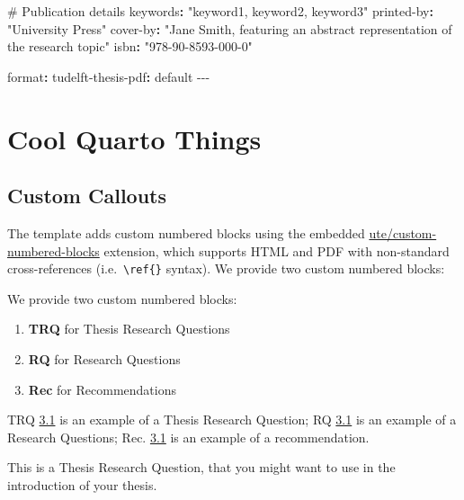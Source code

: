 \documentclass{tudelft}
\newenvironment{Shaded}{\begin{snugshade}}{\end{snugshade}}
\newcommand{\AttributeTok}[1]{\textcolor[rgb]{0.40,0.45,0.13}{#1}}
\newcommand{\CommentTok}[1]{\textcolor[rgb]{0.37,0.37,0.37}{#1}}
\newcommand{\FunctionTok}[1]{\textcolor[rgb]{0.28,0.35,0.67}{#1}}
\newcommand{\KeywordTok}[1]{\textcolor[rgb]{0.00,0.23,0.31}{\textbf{#1}}}
\newcommand{\PreprocessorTok}[1]{\textcolor[rgb]{0.68,0.00,0.00}{#1}}
\newcommand{\StringTok}[1]{\textcolor[rgb]{0.13,0.47,0.30}{#1}}
\providecommand{\tightlist}{%
  \setlength{\itemsep}{0pt}\setlength{\parskip}{0pt}}
\newenvironment{fbx}[3]{\begin{tcolorbox}[enhanced, breakable,%
attach boxed title to top*={xshift=1.4pt},
boxed title style={boxrule=0.0mm, fuzzy shadow={1pt}{-1pt}{0mm}{0.1mm}{gray}, arc=.3em, rounded corners=east, sharp corners=west}, colframe=#1-color2, colbacktitle=#1-color1, colback = white, coltitle=black,  titlerule=0mm, toprule=0pt, bottomrule=.7pt, leftrule=.3em, rightrule=0pt, outer arc=.3em,  arc=0pt,	 sharp corners = east, left=.5em, bottomtitle=1mm, toptitle=1mm,title=\textbf{#2}\hspace{0.5em}{#3}]}
{\end{tcolorbox}}
\begin{document}
\begin{Shaded}
\begin{Highlighting}[]
\CommentTok{\# Publication details}
\FunctionTok{keywords}\KeywordTok{:}\AttributeTok{ }\StringTok{"keyword1, keyword2, keyword3"}
\FunctionTok{printed{-}by}\KeywordTok{:}\AttributeTok{ }\StringTok{"University Press"}
\FunctionTok{cover{-}by}\KeywordTok{:}\AttributeTok{ }\StringTok{"Jane Smith, featuring an abstract representation of the research topic"}
\FunctionTok{isbn}\KeywordTok{:}\AttributeTok{ }\StringTok{"978{-}90{-}8593{-}000{-}0"}

\FunctionTok{format}\KeywordTok{:}
\AttributeTok{  }\FunctionTok{tudelft{-}thesis{-}pdf}\KeywordTok{:}\AttributeTok{ default}
\PreprocessorTok{{-}{-}{-}}
\end{Highlighting}
\end{Shaded}


\chapter{Cool Quarto Things}\label{cool-quarto-things}

\section{Custom Callouts}\label{custom-callouts}

The template adds custom numbered blocks using the embedded
\href{https://github.com/ute/custom-numbered-blocks}{ute/custom-numbered-blocks}
extension, which supports HTML and PDF with non-standard
cross-references (i.e.~\texttt{\textbackslash{}ref\{\}} syntax). We
provide two custom numbered blocks:

We provide two custom numbered blocks:

\begin{enumerate}
\def\labelenumi{\arabic{enumi}.}
\tightlist
\item
  \textbf{TRQ} for Thesis Research Questions
\item
  \textbf{RQ} for Research Questions
\item
  \textbf{Rec} for Recommendations
\end{enumerate}

TRQ \hyperref[trq:what]{3.1} is an example of a Thesis Research
Question; RQ \hyperref[rq:what]{3.1} is an example of a Research
Questions; Rec. \hyperref[rec:what]{3.1} is an example of a
recommendation.

\label{trq:what}
\begin{fbx}{TRQ}{Thesis Research Question 3.1: }{What is a TRQ?}
\label{trq:what}
This is a Thesis Research Question, that you might want to use in the
introduction of your thesis.

\end{fbx}
\end{document}
